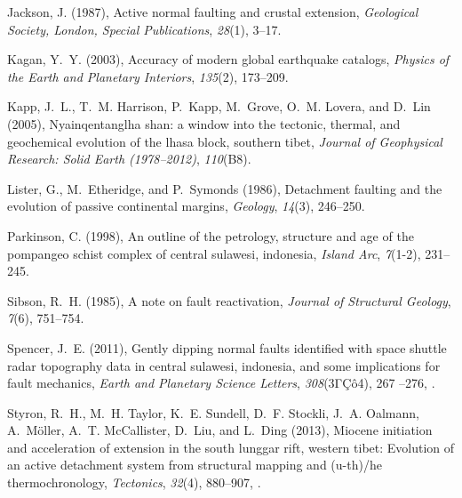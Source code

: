 \documentclass[twocolumn,grl]{AGUTeX}
\begin{document}
\begin{article}
\begin{thebibliography}{29}
Jackson, J. (1987), Active normal faulting and crustal extension,
  \textit{Geological Society, London, Special Publications}, \textit{28}(1),
  3--17.

Kagan, Y.~Y. (2003), Accuracy of modern global earthquake catalogs,
  \textit{Physics of the Earth and Planetary Interiors}, \textit{135}(2),
  173--209.

Kapp, J.~L., T.~M. Harrison, P.~Kapp, M.~Grove, O.~M. Lovera, and D.~Lin
  (2005), Nyainqentanglha shan: a window into the tectonic, thermal, and
  geochemical evolution of the lhasa block, southern tibet, \textit{Journal of
  Geophysical Research: Solid Earth (1978--2012)}, \textit{110}(B8).

Lister, G., M.~Etheridge, and P.~Symonds (1986), Detachment faulting and the
  evolution of passive continental margins, \textit{Geology}, \textit{14}(3),
  246--250.

Parkinson, C. (1998), An outline of the petrology, structure and age of the
  pompangeo schist complex of central sulawesi, indonesia, \textit{Island Arc},
  \textit{7}(1-2), 231--245.

Sibson, R.~H. (1985), A note on fault reactivation, \textit{Journal of
  Structural Geology}, \textit{7}(6), 751--754.

Spencer, J.~E. (2011), Gently dipping normal faults identified with space
  shuttle radar topography data in central sulawesi, indonesia, and some
  implications for fault mechanics, \textit{Earth and Planetary Science
  Letters}, \textit{308}(3ΓÇô4), 267 --276, .

Styron, R.~H., M.~H. Taylor, K.~E. Sundell, D.~F. Stockli, J.~A. Oalmann,
  A.~M{\"o}ller, A.~T. McCallister, D.~Liu, and L.~Ding (2013), Miocene
  initiation and acceleration of extension in the south lunggar rift, western
  tibet: Evolution of an active detachment system from structural mapping and
  (u-th)/he thermochronology, \textit{Tectonics}, \textit{32}(4), 880--907,
  .


\end{thebibliography}
\end{article}
\end{document}
